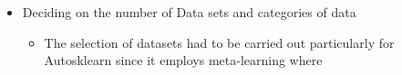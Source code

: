 \begin{itemize}
\begin{itemize}
    \end{itemize}
    
    \item Deciding on the number of Data sets and categories of data
    
    \begin{itemize}
        \item The selection of datasets had to be carried out particularly for Autosklearn since it employs meta-learning where 
    \end{itemize}
    
    
    
\end{itemize}

